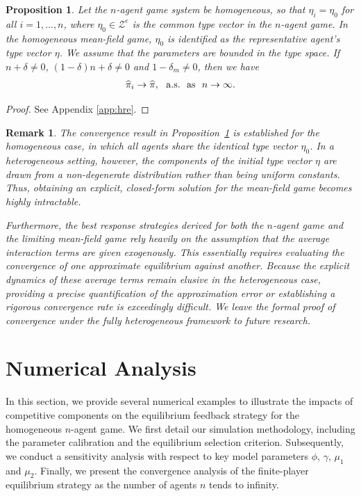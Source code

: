 \documentclass[11pt]{article}
\newtheorem{proposition}[theorem]{Proposition}%
\newtheorem{remark}{Remark}[section]
\numberwithin{equation}{section}
\begin{document}
\begin{proposition}\label{th:hre}
Let the \(n\)-agent game system be homogeneous, so that \(\eta_i = \eta_0\) for all
\(i = 1, \ldots, n\), where \(\eta_0 \in \mathcal{Z}^e\) is the common type vector in the \(n\)-agent game.  In the homogeneous mean-field game, $\eta_0$ is identified as the
representative agent's type vector $\eta$.  We assume that  the parameters are bounded in the type space. If $n + \delta \neq 0$, $(1 - \delta)n + \delta \neq 0$ and \(1-\delta_{\scriptscriptstyle m}\neq 0\), then we have
		\begin{align}
			\widehat{\pi}_i\to\widehat{\pi},~~{\rm{ a.s.}} ~~\text{as}~~ n\to\infty. \label{eq:limit_pi}
		\end{align}
	\end{proposition}
\begin{proof}
	See Appendix \ref{app:hre}.
\end{proof}	
	
\begin{remark}
The convergence result in Proposition~\ref{th:hre} is established for the homogeneous case, in which all agents share the identical type vector \(\eta_0\). In a heterogeneous setting, however, the components of the initial type vector \(\eta\) are drawn from a non-degenerate distribution rather than being uniform constants. Thus, obtaining an explicit, closed-form solution for the mean-field game becomes highly intractable.
		
Furthermore, the best response strategies derived for both the \(n\)-agent game and the limiting mean-field game rely heavily on the assumption that the average interaction terms are given exogenously. This essentially requires evaluating the convergence of one approximate equilibrium against another. Because the explicit dynamics of these average terms remain elusive in the heterogeneous case, providing a precise quantification of the approximation error or establishing a rigorous convergence rate is exceedingly difficult. We leave the formal proof of convergence under the fully heterogeneous framework to future research.
	\end{remark}
	


\section{Numerical Analysis}\label{sec:NA}	
In this section, we provide several numerical examples to illustrate the impacts of competitive components on the equilibrium feedback strategy for the homogeneous \(n\)-agent game. We first detail our simulation methodology, including the parameter calibration and the equilibrium selection criterion. Subsequently, we conduct a sensitivity analysis with respect to key model parameters  \(\phi\), \(\gamma\), \(\mu_1\) and \(\mu_2\).  Finally, we present the convergence analysis of the finite-player equilibrium strategy as the number of agents \(n\) tends to infinity.
\end{document}
